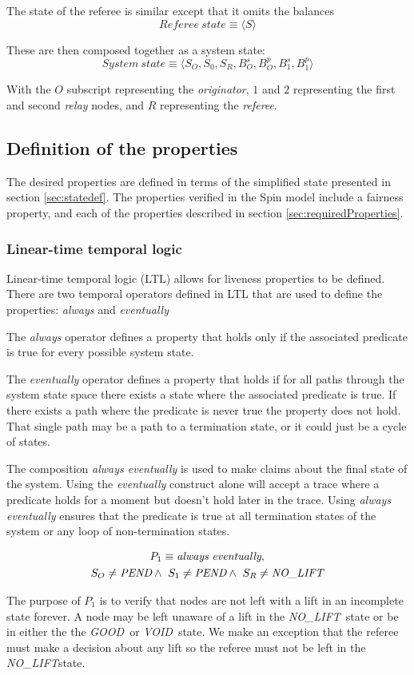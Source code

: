 \documentclass[runningheads]{llncs}
\newcommand{\originatorstate}{S_O}
\newcommand{\relayastate}{S_1}
\newcommand{\refstate}{S_R}
\newcommand{\nolift}{\emph{NO\_LIFT}}
\newcommand{\pend}{\emph{PEND}}
\newcommand{\void}{\emph{VOID}}
\newcommand{\good}{\emph{GOOD}}
\newcommand{\always}{\emph{always}}
\newcommand{\eventually}{\emph{eventually}}
\begin{document}
The state of the referee is similar except that it omits the balances
$$Referee~state \equiv \langle S \rangle$$

These are then composed together as a system state:
$$System~state \equiv \langle S_O, S_0, S_R, B^s_O, B^p_O, B^s_1, B^p_1 \rangle$$

With the $O$ subscript representing the \emph{originator}, $1$ and $2$ representing the first and second \emph{relay} nodes, and $R$ representing the \emph{referee}.

\subsection{Definition of the properties}
The desired properties are defined in terms of the simplified state presented in section \ref{sec:statedef}. 
The properties verified in the Spin model include a fairness property, and each of the properties described in section \ref{sec:requiredProperties}. 

\subsubsection{Linear-time temporal logic}
Linear-time temporal logic (LTL) allows for liveness properties to be defined. There are two temporal operators defined in LTL that are used to define the properties: \emph{always} and \emph{eventually}

The \emph{always} operator defines a property that holds only if the associated predicate is true for every possible system state.

The \emph{eventually} operator defines a property that holds if for all paths through the system state space there exists a state where the associated predicate is true. If there exists a path where the predicate is never true the property does not hold. That single path may be a path to a termination state, or it could just be a cycle of states. 

The composition \emph{always eventually} is used to make claims about the final state of the system. Using the \emph{eventually} construct alone will accept a trace where a predicate holds for a moment but doesn't hold later in the trace. Using \emph{always eventually} ensures that the predicate is true at all termination states of the system or any loop of non-termination states. 

\begin{definition}[Property 1]
\begin{multline*}
    P_1 \equiv \always\ \eventually,\\
    \originatorstate \neq \pend \wedge\ \relayastate \neq \pend \wedge\ \refstate \neq \nolift\\
\end{multline*}
\end{definition}
The purpose of $P_1$ is to verify that nodes are not left with a lift in an incomplete state forever. A node may be left unaware of a lift in the \nolift\ state or be in either the the \good\ or \void\ state. We make an exception that the referee must make a decision about any lift so the referee must not be left in the \nolift state. 
\end{document}
